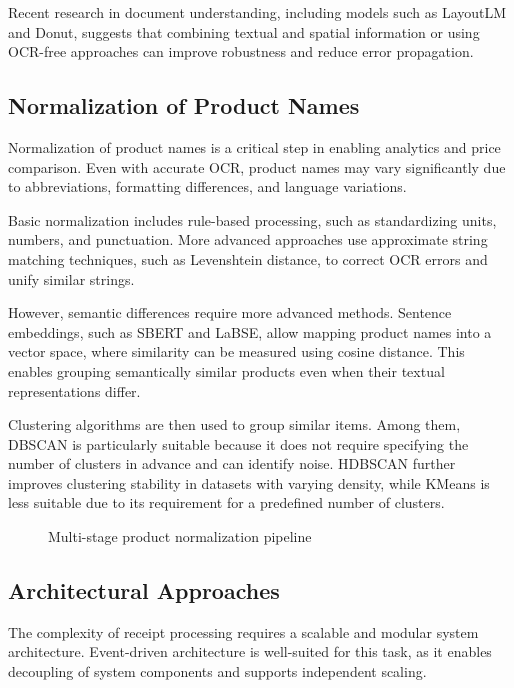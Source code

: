 Recent research in document understanding, including models such as LayoutLM and Donut, suggests that combining textual and spatial information or using OCR-free approaches can improve robustness and reduce error propagation.

\subsection{Normalization of Product Names}

Normalization of product names is a critical step in enabling analytics and price comparison. Even with accurate OCR, product names may vary significantly due to abbreviations, formatting differences, and language variations.

Basic normalization includes rule-based processing, such as standardizing units, numbers, and punctuation. More advanced approaches use approximate string matching techniques, such as Levenshtein distance, to correct OCR errors and unify similar strings.

However, semantic differences require more advanced methods. Sentence embeddings, such as SBERT and LaBSE, allow mapping product names into a vector space, where similarity can be measured using cosine distance. This enables grouping semantically similar products even when their textual representations differ.

Clustering algorithms are then used to group similar items. Among them, DBSCAN is particularly suitable because it does not require specifying the number of clusters in advance and can identify noise. HDBSCAN further improves clustering stability in datasets with varying density, while KMeans is less suitable due to its requirement for a predefined number of clusters.

\begin{figure}[h]
\centering
{}
\caption{Multi-stage product normalization pipeline}
\end{figure}

\subsection{Architectural Approaches}

The complexity of receipt processing requires a scalable and modular system architecture. Event-driven architecture is well-suited for this task, as it enables decoupling of system components and supports independent scaling.

